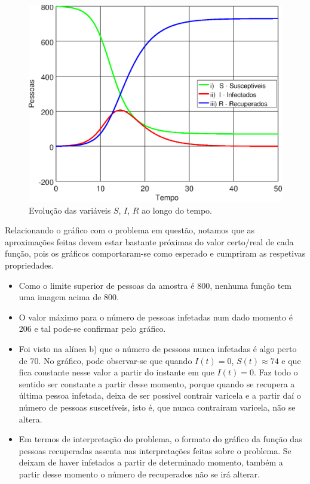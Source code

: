 \documentclass[portuguese, a4paper]{article}
\begin{document}
		\begin{figure}[H]
			\centering
			\includegraphics[width=0.80\linewidth]{IIIc_fitted}
			\captionsetup{width=0.80\linewidth}
			\caption[Caption]{Evolução das variáveis $S$, $I$, $R$ ao longo do
			tempo.
			\footnotemark}
		\end{figure}

		\par
		Relacionando o gráfico com o problema em questão, notamos que as aproximações feitas devem estar
		bastante próximas do valor certo/real de cada função, pois os gráficos comportaram-se como esperado e cumpriram as respetivas propriedades.

		\begin{itemize}
		\item Como o limite superior de pessoas da amostra é 800, nenhuma função tem uma imagem acima de 800.
		\item O valor máximo para o número de pessoas infetadas num dado momento é 206 e tal pode-se confirmar pelo gráfico.
		\item Foi visto na alínea b) que o número de pessoas
		nunca infetadas é algo perto de 70. %
		No gráfico, pode observar-se que quando $I(t) = 0$, $S(t) \approx 74$ e que fica constante nesse valor a partir do instante em que $I(t) = 0$.
		Faz todo o sentido ser constante a partir desse momento, porque quando
		se recupera a última pessoa infetada, deixa de ser possivel contrair
		varicela e a partir daí o número de pessoas suscetíveis, isto é, que
		nunca contrairam varicela, não se altera.
		\item Em termos de interpretação do problema, o formato do gráfico da função das pessoas recuperadas assenta nas interpretações
		feitas sobre o problema. Se deixam de haver infetados a partir de determinado momento,
		também a partir desse momento o número de recuperados não se irá
		alterar.
		\end{itemize}
\end{document}
